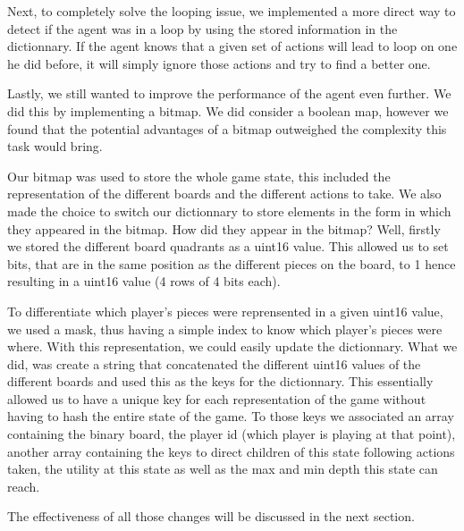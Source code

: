 \documentclass[11pt,a4paper]{report}
\begin{document}
\begin{answers}[21cm]
    Next, to completely solve the looping issue, we implemented a more direct way to detect if the agent was in a loop by using the 
    stored information in the dictionnary. If the agent knows that a given set of actions will lead to loop on one he did before,
    it will simply ignore those actions and try to find a better one. 

    Lastly, we still wanted to improve the performance of the agent even further. We did this by implementing a bitmap. 
    We did consider a boolean map, however we found that the potential advantages of a bitmap outweighed the complexity
    this task would bring. 

    Our bitmap was used to store the whole game state, this included the representation of the different boards and the 
    different actions to take. We also made the choice to switch our dictionnary to store elements in the form in which
    they appeared in the bitmap. How did they appear in the bitmap? Well, firstly we stored the different board quadrants
    as a uint16 value. This allowed us to set bits, that are in the same position as the different pieces on the board, to 1 hence resulting 
    in a uint16 value (4 rows of 4 bits each).  
\end{answers}

\begin{answers}[23cm]
    To differentiate which player's pieces were reprensented in a given uint16 value, we used a mask, thus having a simple 
    index to know which player's pieces were where. With this representation, we could easily update the dictionnary. 
    What we did, was create a string that concatenated the different uint16 values of the different boards and used this as the 
    keys for the dictionnary. This essentially allowed us to have a unique key for each representation of the game without 
    having to hash the entire state of the game. 
    To those keys we associated an array containing the binary board, the player id (which player is playing at that point),
    another array containing the keys to direct children of this state following actions taken, the utility at this state
    as well as the max and min depth this state can reach. 
    
    The effectiveness of all those changes will be discussed in the next section.
\end{answers}

\begin{answers}[23cm]
\end{answers}
\end{document}
